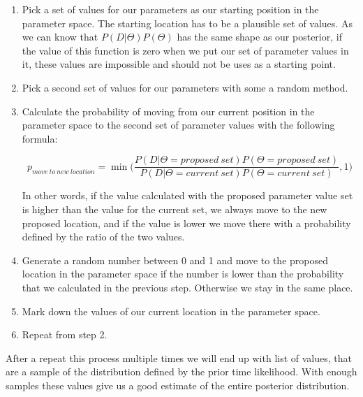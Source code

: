 \documentclass[12pt,a4paper,leqno]{report}
\theoremstyle{plain}
\theoremstyle{definition}
\theoremstyle{remark}
\begin{document}
\begin{enumerate}
    \item Pick a set of values for our parameters as our starting position in
          the parameter space. The starting location has to be a plausible set
          of values. As we can know that
          \(P(D|\Theta)P(\Theta)\) has the same shape as our posterior, if
          the value of this function is zero when we put our set of
          parameter values in it, these values are impossible and should not be
          uses as a starting point.
    \item Pick a second set of values for our parameters with some a random method.
    \item Calculate the probability of moving from our current position in the
          parameter space to the second set of parameter values with the
          following formula:

          \begin{def}\label{randomwalk}
              \begin{equation*}
                  p_{move\ to\ new\ location} = \min \bigg(\frac{P(D|\Theta = proposed\ set)P(\Theta = proposed\ set)}{P(D|\Theta = current\ set)P(\Theta = current\ set)}, 1 \bigg)
              \end{equation*}
          \end{def}

          In other words, if the value calculated with the proposed parameter
          value set is higher than the value for the current set, we always move
          to the new proposed location, and if the value
          is lower we move there with a probability defined by the ratio of the
          two values.
    \item Generate a random number between 0 and 1 and move to the proposed
          location in the parameter space if the number is lower than the
          probability that we calculated in the previous step. Otherwise we stay
          in the same place.
    \item Mark down the values of our current location in the parameter space.
    \item Repeat from step 2.

\end{enumerate}

After a repeat this process multiple times we will end up with list of values,
that are a sample of the distribution defined by the prior time
likelihood. With enough samples these values give us a good estimate of the entire
posterior distribution.
\end{document}

